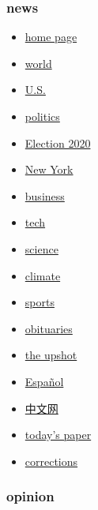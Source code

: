 \hypertarget{news}{%
\subsubsection{news}\label{news}}

\begin{itemize}
\tightlist
\item
  \href{https://www.nytimes.com}{home page}
\item
  \href{https://www.nytimes.com/section/world}{world}
\item
  \href{https://www.nytimes.com/section/us}{U.S.}
\item
  \href{https://www.nytimes.com/section/politics}{politics}
\item
  \href{https://www.nytimes.com/news-event/2020-election}{Election 2020}
\item
  \href{https://www.nytimes.com/section/nyregion}{New York}
\item
  \href{https://www.nytimes.com/section/business}{business}
\item
  \href{https://www.nytimes.com/section/technology}{tech}
\item
  \href{https://www.nytimes.com/section/science}{science}
\item
  \href{https://www.nytimes.com/section/climate}{climate}
\item
  \href{https://www.nytimes.com/section/sports}{sports}
\item
  \href{https://www.nytimes.com/section/obituaries}{obituaries}
\item
  \href{https://www.nytimes.com/section/upshot}{the upshot}
\item
  \href{https://www.nytimes.com/es/}{Español}
\item
  \href{https://cn.nytimes.com/}{中文网}
\item
  \href{https://www.nytimes.com/section/todayspaper}{today's paper}
\item
  \href{https://www.nytimes.com/section/corrections}{corrections}
\end{itemize}

\hypertarget{opinion}{%
\subsubsection{opinion}\label{opinion}}

